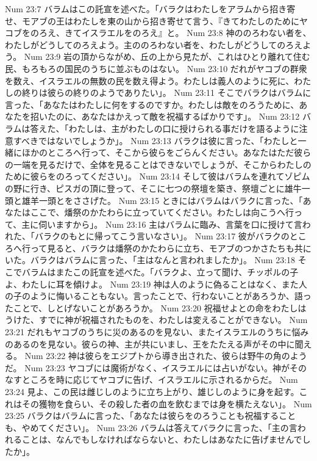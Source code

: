 Num 23:7  バラムはこの託宣を述べた。「バラクはわたしをアラムから招き寄せ、モアブの王はわたしを東の山から招き寄せて言う、『きてわたしのためにヤコブをのろえ、きてイスラエルをのろえ』と。
Num 23:8  神ののろわない者を、わたしがどうしてのろえよう。主ののろわない者を、わたしがどうしてのろえよう。
Num 23:9  岩の頂からながめ、丘の上から見たが、これはひとり離れて住む民、もろもろの国民のうちに並ぶものはない。
Num 23:10  だれがヤコブの群衆を数え、イスラエルの無数の民を数え得よう。わたしは義人のように死に、わたしの終りは彼らの終りのようでありたい」。
Num 23:11  そこでバラクはバラムに言った、「あなたはわたしに何をするのですか。わたしは敵をのろうために、あなたを招いたのに、あなたはかえって敵を祝福するばかりです」。
Num 23:12  バラムは答えた、「わたしは、主がわたしの口に授けられる事だけを語るように注意すべきではないでしょうか」。
Num 23:13  バラクは彼に言った、「わたしと一緒にほかのところへ行って、そこから彼らをごらんください。あなたはただ彼らの一端を見るだけで、全体を見ることはできないでしょうが、そこからわたしのために彼らをのろってください」。
Num 23:14  そして彼はバラムを連れてゾピムの野に行き、ピスガの頂に登って、そこに七つの祭壇を築き、祭壇ごとに雄牛一頭と雄羊一頭とをささげた。
Num 23:15  ときにはバラムはバラクに言った、「あなたはここで、燔祭のかたわらに立っていてください。わたしは向こうへ行って、主に伺いますから」。
Num 23:16  主はバラムに臨み、言葉を口に授けて言われた、「バラクのもとに帰ってこう言いなさい」。
Num 23:17  彼がバラクのところへ行って見ると、バラクは燔祭のかたわらに立ち、モアブのつかさたちも共にいた。バラクはバラムに言った、「主はなんと言われましたか」。
Num 23:18  そこでバラムはまたこの託宣を述べた。「バラクよ、立って聞け、チッポルの子よ、わたしに耳を傾けよ。
Num 23:19  神は人のように偽ることはなく、また人の子のように悔いることもない。言ったことで、行わないことがあろうか、語ったことで、しとげないことがあろうか。
Num 23:20  祝福せよとの命をわたしはうけた、すでに神が祝福されたものを、わたしは変えることができない。
Num 23:21  だれもヤコブのうちに災のあるのを見ない、またイスラエルのうちに悩みのあるのを見ない。彼らの神、主が共にいまし、王をたたえる声がその中に聞える。
Num 23:22  神は彼らをエジプトから導き出された、彼らは野牛の角のようだ。
Num 23:23  ヤコブには魔術がなく、イスラエルには占いがない。神がそのなすところを時に応じてヤコブに告げ、イスラエルに示されるからだ。
Num 23:24  見よ、この民は雌じしのように立ち上がり、雄じしのように身を起す。これはその獲物を食らい、その殺した者の血を飲むまでは身を横たえない」。
Num 23:25  バラクはバラムに言った、「あなたは彼らをのろうことも祝福することも、やめてください」。
Num 23:26  バラムは答えてバラクに言った、「主の言われることは、なんでもしなければならないと、わたしはあなたに告げませんでしたか」。
